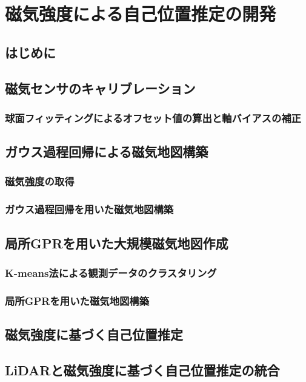 \chapter{磁気強度による自己位置推定の開発}

\graphicspath{{figures/04}}


\section{はじめに}
\label{sec:kalman_filter}

\section{磁気センサのキャリブレーション}
\subsection{球面フィッティングによるオフセット値の算出と軸バイアスの補正}

\section{ガウス過程回帰による磁気地図構築}
\subsection{磁気強度の取得}
\subsection{ガウス過程回帰を用いた磁気地図構築}

\section{局所GPRを用いた大規模磁気地図作成}
\subsection{K-means法による観測データのクラスタリング}
\subsection{局所GPRを用いた磁気地図構築}

\section{磁気強度に基づく自己位置推定}

\section{LiDARと磁気強度に基づく自己位置推定の統合}

